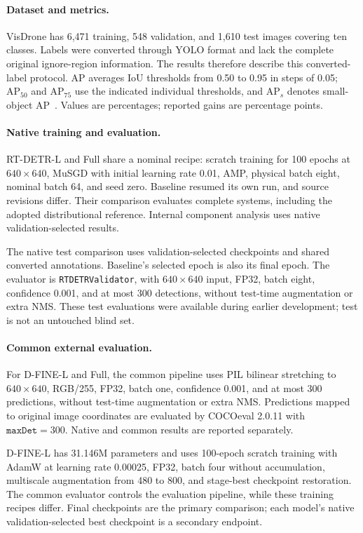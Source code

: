 \paragraph{Dataset and metrics.}
VisDrone has 6,471 training, 548 validation, and 1,610 test images covering ten classes. Labels were converted through YOLO format and lack the complete original ignore-region information. The results therefore describe this converted-label protocol. AP averages IoU thresholds from 0.50 to 0.95 in steps of 0.05; $\mathrm{AP}_{50}$ and $\mathrm{AP}_{75}$ use the indicated individual thresholds, and $\mathrm{AP}_{s}$ denotes small-object AP~\cite{lin2014coco}. Values are percentages; reported gains are percentage points.

\paragraph{Native training and evaluation.}
RT-DETR-L and Full share a nominal recipe: scratch training for 100 epochs at $640\times640$, MuSGD with initial learning rate 0.01, AMP, physical batch eight, nominal batch 64, and seed zero. Baseline resumed its own run, and source revisions differ. Their comparison evaluates complete systems, including the adopted distributional reference. Internal component analysis uses native validation-selected results.

The native test comparison uses validation-selected checkpoints and shared converted annotations. Baseline's selected epoch is also its final epoch. The evaluator is \texttt{RTDETRValidator}, with $640\times640$ input, FP32, batch eight, confidence 0.001, and at most 300 detections, without test-time augmentation or extra NMS. These test evaluations were available during earlier development; test is not an untouched blind set.

\paragraph{Common external evaluation.}
For D-FINE-L and Full, the common pipeline uses PIL bilinear stretching to $640\times640$, RGB/255, FP32, batch one, confidence 0.001, and at most 300 predictions, without test-time augmentation or extra NMS. Predictions mapped to original image coordinates are evaluated by COCOeval 2.0.11 with $\texttt{maxDet}=300$. Native and common results are reported separately.

D-FINE-L has 31.146M parameters and uses 100-epoch scratch training with AdamW at learning rate 0.00025, FP32, batch four without accumulation, multiscale augmentation from 480 to 800, and stage-best checkpoint restoration. The common evaluator controls the evaluation pipeline, while these training recipes differ. Final checkpoints are the primary comparison; each model's native validation-selected best checkpoint is a secondary endpoint.

